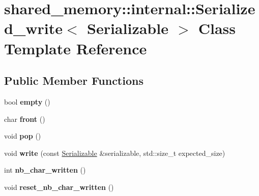 \hypertarget{classshared__memory_1_1internal_1_1Serialized__write}{}\section{shared\+\_\+memory\+:\+:internal\+:\+:Serialized\+\_\+write$<$ Serializable $>$ Class Template Reference}
\label{classshared__memory_1_1internal_1_1Serialized__write}
\subsection*{Public Member Functions}
\begin{DoxyCompactItemize}
\item 
\mbox{\label{classshared__memory_1_1internal_1_1Serialized__write_a1166684494bff2d969ca16ccbeee486a}} 
bool {\bfseries empty} ()
\item 
\mbox{\label{classshared__memory_1_1internal_1_1Serialized__write_a96412580e8aedd0e1fa90f8b64e4745f}} 
char {\bfseries front} ()
\item 
\mbox{\label{classshared__memory_1_1internal_1_1Serialized__write_adf6c52536a53dbc1181eab1409a3641b}} 
void {\bfseries pop} ()
\item 
\mbox{\label{classshared__memory_1_1internal_1_1Serialized__write_a32f8f7e6faabf358283736f51e40b33c}} 
void {\bfseries write} (const \hyperlink{classSerializable}{Serializable} \&serializable, std\+::size\+\_\+t expected\+\_\+size)
\item 
\mbox{\label{classshared__memory_1_1internal_1_1Serialized__write_a830ed6c58591e8284ecb1b8b2e936e03}} 
int {\bfseries nb\+\_\+char\+\_\+written} ()
\item 
\mbox{\label{classshared__memory_1_1internal_1_1Serialized__write_a58b23378ce903e1aadf7c5e497022e5f}} 
void {\bfseries reset\+\_\+nb\+\_\+char\+\_\+written} ()
\end{DoxyCompactItemize}
